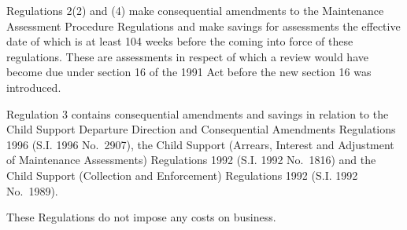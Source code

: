 \documentclass[12pt,a4paper]{article}
\begin{document}
  Regulations 2(2) and (4) make consequential amendments to the Maintenance Assessment Procedure Regulations and make savings for assessments the effective date of which is at least 104 weeks before the coming into force of these regulations. These are assessments in respect of which a review would have become due under section 16 of the 1991 Act before the new section 16 was introduced.

  Regulation 3 contains consequential amendments and savings in relation to the Child Support Departure Direction and Consequential Amendments Regulations 1996 (S.I. 1996 No.\ 2907), the Child Support (Arrears, Interest and Adjustment of Maintenance Assessments) Regulations 1992 (S.I. 1992 No.\ 1816) and the Child Support (Collection and Enforcement) Regulations 1992 (S.I. 1992 No.\ 1989).

  These Regulations do not impose any costs on business.
\end{document}
